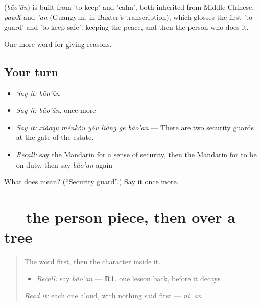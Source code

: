 \begin{cousinweb}
\textbf{} (\emph{bǎo'ān}) is built from  'to keep' and  'calm', both inherited from Middle Chinese, \emph{pawX} and \emph{'an} (Guangyun, in Baxter's transcription), which glosses the first 'to guard' and 'to keep safe': keeping the peace, and then the person who does it.
\end{cousinweb}

\begin{grammarlens}[title={What you've built}]
One more word for giving reasons.
\end{grammarlens}

\subsection*{Your turn}
\begin{itemize}
\raggedright
  \item \emph{Say it:} \emph{bǎo'ān}
  \item \emph{Say it:} \emph{bǎo'ān}, once more
  \item \emph{Say it:} \emph{xiǎoqū ménkǒu yǒu liǎng ge bǎo'ān} — There are two security guards at the gate of the estate.
  \item \emph{Recall:} say the Mandarin for a sense of security, then the Mandarin for to be on duty, then say \emph{bǎo'ān} again
\end{itemize}

\begin{tcolorbox}[breakable,colback=teal!4,colframe=teal!35!black,title={Before you move on}]
What does  mean? (\textquotedblleft{}Security guard\textquotedblright{}.) Say it once more.
\end{tcolorbox}
\section[\texorpdfstring{\zh{保} (bǎo)}{保 (bǎo)}]{ — the person piece, then  over a tree}

\label{lesson:ZH-W382-bao-keep}



\begin{quote}
The word first, then the character inside it.

\begin{itemize}
\raggedright
  \item \emph{Recall:} say \emph{bǎo'ān} — \textbf{R1}, one lesson back, before it decays
\end{itemize}

\begin{quote}
 
\end{quote}

\emph{Read it:} each one aloud, with nothing said first — \emph{nǐ}, \emph{ān}
\end{quote}

